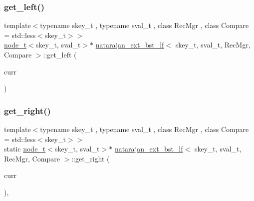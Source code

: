 \mbox{\label{classnatarajan__ext__bst__lf_ab75e566e3b6845734860439339da0a29}} 
\subsubsection{\texorpdfstring{get\+\_\+left()}{get\_left()}\hspace{0.1cm}{\footnotesize\ttfamily [2/2]}}
{\footnotesize\ttfamily template$<$typename skey\+\_\+t , typename sval\+\_\+t , class Rec\+Mgr , class Compare  = std\+::less$<$skey\+\_\+t$>$$>$ \\
\hyperlink{structnode__t}{node\+\_\+t}$<$skey\+\_\+t, sval\+\_\+t$>$$\ast$ \hyperlink{classnatarajan__ext__bst__lf}{natarajan\+\_\+ext\+\_\+bst\+\_\+lf}$<$ skey\+\_\+t, sval\+\_\+t, Rec\+Mgr, Compare $>$\+::get\+\_\+left (\begin{DoxyParamCaption}\item[{\hyperlink{structnode__t}{node\+\_\+t}$<$ skey\+\_\+t, sval\+\_\+t $>$ $\ast$}]{curr }\end{DoxyParamCaption})\hspace{0.3cm}{\ttfamily [inline]}}

\mbox{\label{classnatarajan__ext__bst__lf_acad3f9381d04db56dbc3fd77c61c28ae}} 
\subsubsection{\texorpdfstring{get\+\_\+right()}{get\_right()}\hspace{0.1cm}{\footnotesize\ttfamily [1/2]}}
{\footnotesize\ttfamily template$<$typename skey\+\_\+t , typename sval\+\_\+t , class Rec\+Mgr , class Compare  = std\+::less$<$skey\+\_\+t$>$$>$ \\
static \hyperlink{structnode__t}{node\+\_\+t}$<$skey\+\_\+t, sval\+\_\+t$>$$\ast$ \hyperlink{classnatarajan__ext__bst__lf}{natarajan\+\_\+ext\+\_\+bst\+\_\+lf}$<$ skey\+\_\+t, sval\+\_\+t, Rec\+Mgr, Compare $>$\+::get\+\_\+right (\begin{DoxyParamCaption}\item[{\hyperlink{structnode__t}{node\+\_\+t}$<$ skey\+\_\+t, sval\+\_\+t $>$ $\ast$}]{curr }\end{DoxyParamCaption})\hspace{0.3cm}{\ttfamily [inline]}, {\ttfamily [static]}}

